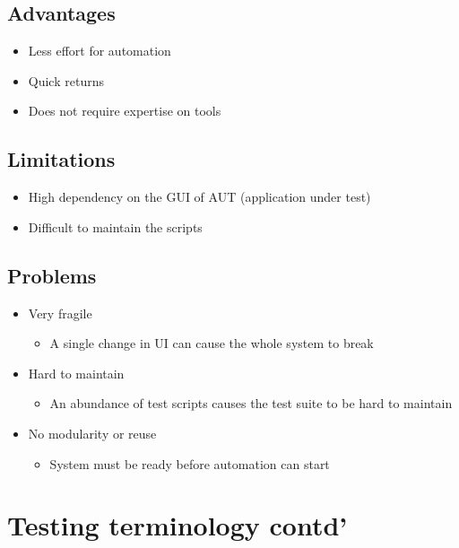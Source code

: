 \documentclass[12pt]{book}
\begin{document}
\subsection*{Advantages}
\begin{itemize}
    \item Less effort for automation
    \item Quick returns
    \item Does not require expertise on tools
\end{itemize}

\subsection*{Limitations}
\begin{itemize}
    \item High dependency on the GUI of AUT (application under test)
    \item Difficult to maintain the scripts
\end{itemize}

\subsection*{Problems}

\begin{itemize}
    \item Very fragile
    \begin{itemize}
        \item A single change in UI can cause the whole system to break
    \end{itemize} 
    \item Hard to maintain
    \begin{itemize}
        \item An abundance of test scripts causes the test suite to be hard to maintain
    \end{itemize} 
    \item No modularity or reuse
    \begin{itemize}
        \item System must be ready before automation can start
    \end{itemize} 
\end{itemize}

\section*{Testing terminology contd'}
\end{document}
